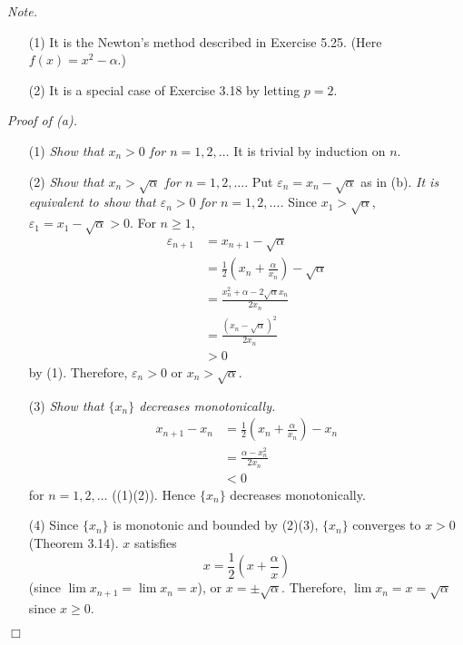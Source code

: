 \documentclass{article}
\begin{document}
\emph{Note.}
\begin{enumerate}
  \item[(1)]
  It is the Newton's method described in Exercise 5.25.
  (Here $f(x) = x^2 - \alpha$.)
  \item[(2)]
  It is a special case of Exercise 3.18 by letting $p = 2$. \\
\end{enumerate}

\emph{Proof of (a).}
\begin{enumerate}
  \item[(1)]
  \emph{Show that $x_n > 0$ for $n=1,2,\ldots$}
  It is trivial by induction on $n$.
  \item[(2)]
  \emph{Show that $x_n > \sqrt{\alpha}$ for $n=1,2,\ldots$}.
  Put $\varepsilon_n = x_n - \sqrt{\alpha}$ as in (b).
  \emph{It is equivalent to show that $\varepsilon_n > 0$ for $n=1,2,\ldots$.}
  Since $x_1 > \sqrt{\alpha}$,
  $\varepsilon_1 = x_1 - \sqrt{\alpha} > 0$. For $n \geq 1$,
  \begin{align*}
    \varepsilon_{n+1}
    &= x_{n+1} - \sqrt{\alpha} \\
    &= \frac{1}{2}\left( x_n + \frac{\alpha}{x_n} \right) - \sqrt{\alpha} \\
    &= \frac{x_n^2 + \alpha - 2\sqrt{\alpha}x_n}{2 x_n} \\
    &= \frac{(x_n - \sqrt{\alpha})^2}{2 x_n} \\
    &> 0
  \end{align*}
  by (1).
  Therefore, $\varepsilon_n > 0$ or $x_n > \sqrt{\alpha}$.
  \item[(3)]
  \emph{Show that $\{x_n\}$ decreases monotonically.}
  \begin{align*}
    x_{n+1} - x_n
    &= \frac{1}{2}\left( x_n + \frac{\alpha}{x_n} \right) - x_n \\
    &= \frac{\alpha - x_n^2}{2x_n} \\
    &< 0
  \end{align*}
  for $n = 1,2,\ldots$ ((1)(2)).
  Hence $\{x_n\}$ decreases monotonically.
  \item[(4)]
  Since $\{x_n\}$ is monotonic and bounded by (2)(3),
  $\{x_n\}$ converges to $x > 0$ (Theorem 3.14).
  $x$ satisfies $$x = \frac{1}{2}\left( x + \frac{\alpha}{x} \right)$$
  (since $\lim x_{n+1} = \lim x_n = x$),
  or $x = \pm \sqrt{\alpha}$.
  Therefore, $\lim x_n = x = \sqrt{\alpha}$ since $x \geq 0$.
\end{enumerate}
$\Box$ \\
\end{document}
